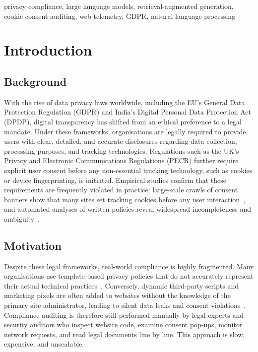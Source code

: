 \documentclass[conference]{IEEEtran}
\begin{document}
\begin{IEEEkeywords}
privacy compliance, large language models, retrieval-augmented generation, cookie consent auditing, web telemetry, GDPR, natural language processing
\end{IEEEkeywords}

\section{Introduction}
\subsection{Background}
With the rise of data privacy laws worldwide, including the EU's General Data Protection Regulation (GDPR) and India's Digital Personal Data Protection Act (DPDP), digital transparency has shifted from an ethical preference to a legal mandate. Under these frameworks, organisations are legally required to provide users with clear, detailed, and accurate disclosures regarding data collection, processing purposes, and tracking technologies. Regulations such as the UK's Privacy and Electronic Communications Regulations (PECR) further require explicit user consent before any non-essential tracking technology, such as cookies or device fingerprinting, is initiated. Empirical studies confirm that these requirements are frequently violated in practice: large-scale crawls of consent banners show that many sites set tracking cookies before any user interaction~\cite{trevisan-2019-cookielaw,bouhoula-2024-cookies}, and automated analyses of written policies reveal widespread incompleteness and ambiguity~\cite{wilson-2016-opp115,harkous-2018-polisis}.

\subsection{Motivation}
Despite these legal frameworks, real-world compliance is highly fragmented. Many organisations use template-based privacy policies that do not accurately represent their actual technical practices~\cite{zimmeck-2017-mobileapps}. Conversely, dynamic third-party scripts and marketing pixels are often added to websites without the knowledge of the primary site administrator, leading to silent data leaks and consent violations~\cite{bouhoula-2024-cookies}. Compliance auditing is therefore still performed manually by legal experts and security auditors who inspect website code, examine consent pop-ups, monitor network requests, and read legal documents line by line. This approach is slow, expensive, and unscalable.
\end{document}
